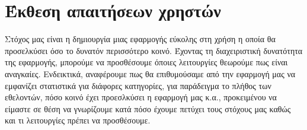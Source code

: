 \section{Έκθεση απαιτήσεων χρηστών}

Στόχος μας είναι η δημιουργία μιας εφαρμογής εύκολης στη χρήση η οποία θα προσελκύσει όσο το δυνατόν περισσότερο κοινό. Έχοντας τη διαχειριστική δυνατότητα της εφαρμογής, μπορούμε να προσθέσουμε όποιες λειτουργίες θεωρούμε πως είναι αναγκαίες. Ενδεικτικά, αναφέρουμε πως θα επιθυμούσαμε από την εφαρμογή μας να εμφανίζει στατιστικά για διάφορες κατηγορίες, για παράδειγμα το πλήθος των εθελοντών, πόσο κοινό έχει προεσλκύσει η εφαρμογή μας κ.α., προκειμένου να είμαστε σε θέση να γνωρίζουμε κατά πόσο έχουμε πετύχει τους στόχους μας καθώς και τι λειτουργίες πρέπει να προσθέσουμε.
